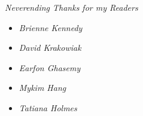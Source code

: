 \thispagestyle{empty}
\vspace*{\fill}
    \textit{Neverending Thanks for my Readers}
    \begin{itemize}
        \item[] \textit{Brienne Kennedy}
        \item[] \textit{David Krakowiak}
        \item[] \textit{Earfon Ghasemy}
        \item[] \textit{Mykim Hang}
        \item[] \textit{Tatiana Holmes}
    \end{itemize}
\vspace*{\fill}
\clearpage